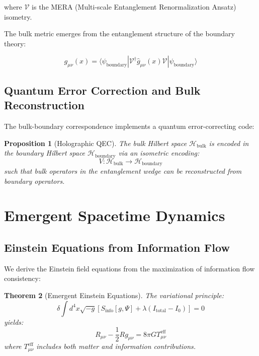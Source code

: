 \documentclass[12pt,a4paper]{article}
\newtheorem{theorem}{Theorem}[section]
\newtheorem{proposition}[theorem]{Proposition}
\begin{document}
where $\mathcal{V}$ is the MERA (Multi-scale Entanglement Renormalization Ansatz) isometry.

The bulk metric emerges from the entanglement structure of the boundary theory:

\begin{equation}
g_{\mu\nu}(x) = \langle \psi_{\text{boundary}} | \mathcal{V}^\dagger \hat{g}_{\mu\nu}(x) \mathcal{V} | \psi_{\text{boundary}} \rangle
\end{equation}

\subsection{Quantum Error Correction and Bulk Reconstruction}

The bulk-boundary correspondence implements a quantum error-correcting code:

\begin{proposition}[Holographic QEC]
The bulk Hilbert space $\mathcal{H}_{\text{bulk}}$ is encoded in the boundary Hilbert space $\mathcal{H}_{\text{boundary}}$ via an isometric encoding:
\begin{equation}
V: \mathcal{H}_{\text{bulk}} \to \mathcal{H}_{\text{boundary}}
\end{equation}
such that bulk operators in the entanglement wedge can be reconstructed from boundary operators.
\end{proposition}

\section{Emergent Spacetime Dynamics}

\subsection{Einstein Equations from Information Flow}

We derive the Einstein field equations from the maximization of information flow consistency:

\begin{theorem}[Emergent Einstein Equations]
The variational principle:
\begin{equation}
\delta \int d^4x \sqrt{-g} \left[S_{\text{info}}[g, \Psi] + \lambda (I_{\text{total}} - I_0)\right] = 0
\end{equation}
yields:
\begin{equation}
R_{\mu\nu} - \frac{1}{2} R g_{\mu\nu} = 8\pi G T_{\mu\nu}^{\text{eff}}
\end{equation}
where $T_{\mu\nu}^{\text{eff}}$ includes both matter and information contributions.
\end{theorem}
\end{document}
